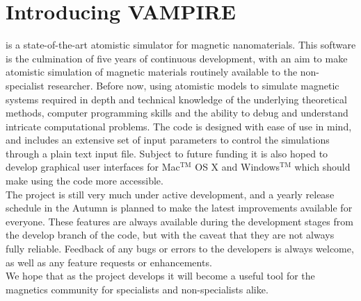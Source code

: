 \chapter*{Introducing {\Huge VAMPIRE}}
\vampire is a state-of-the-art atomistic simulator for magnetic nanomaterials. This software is the culmination of five years of continuous development, with an aim to make atomistic simulation of magnetic materials routinely available to the non-specialist researcher. Before now, using atomistic models to simulate magnetic systems required in depth and technical knowledge of the underlying theoretical methods, computer programming skills and the ability to debug and understand intricate computational problems. The code is designed with ease of use in mind, and includes an extensive set of input parameters to control the simulations through a plain text input file. Subject to future funding it is also hoped to develop graphical user interfaces for Mac$^{\mathrm{TM}}$ OS X and Windows$^{\mathrm{TM}}$ which should make using the code more accessible.\\

The \vampire project is still very much under active development, and a yearly release schedule in the Autumn is planned to make the latest improvements available for everyone. These features are always available during the development stages from the develop branch of the code, but with the caveat that they are not always fully reliable. Feedback of any bugs or errors to the \vampire developers is always welcome, as well as any feature requests or enhancements.\\

We hope that as the \vampire project develops it will become a useful tool for the magnetics community for specialists and non-specialists alike.\\

